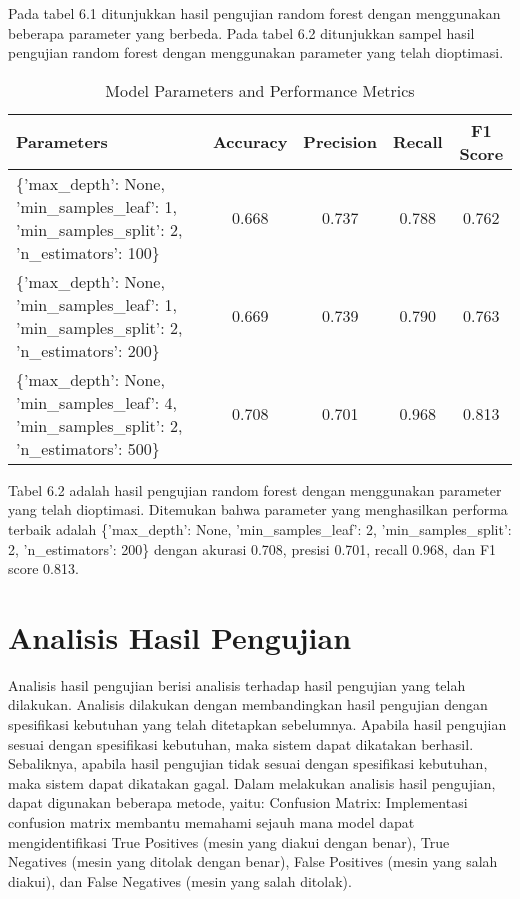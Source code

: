 Pada tabel 6.1 ditunjukkan hasil pengujian random forest dengan menggunakan beberapa parameter yang berbeda. Pada tabel 6.2 ditunjukkan sampel hasil pengujian random forest dengan menggunakan parameter yang telah dioptimasi.


\begin{table}[h]
    \centering
    \begin{tabularx}{\textwidth}{|X|c|c|c|c|}
    \hline
    \textbf{Parameters} & \textbf{Accuracy} & \textbf{Precision} & \textbf{Recall} & \textbf{F1 Score} \\
    \hline
    \{'max\_depth': None, 'min\_samples\_leaf': 1, 'min\_samples\_split': 2, 'n\_estimators': 100\} & 0.668 & 0.737 & 0.788 & 0.762 \\
    \hline
    \{'max\_depth': None, 'min\_samples\_leaf': 1, 'min\_samples\_split': 2, 'n\_estimators': 200\} & 0.669 & 0.739 & 0.790 & 0.763 \\
    \hline
    \{'max\_depth': None, 'min\_samples\_leaf': 4, 'min\_samples\_split': 2, 'n\_estimators': 500\} & 0.708 & 0.701 & 0.968 & 0.813 \\
    \hline
    \end{tabularx}
    \caption{Model Parameters and Performance Metrics}
    \label{table:1}
\end{table}

Tabel 6.2 adalah hasil pengujian random forest dengan menggunakan parameter yang telah dioptimasi. Ditemukan bahwa parameter yang menghasilkan performa terbaik adalah \{'max\_depth': None, 'min\_samples\_leaf': 2, 'min\_samples\_split': 2, 'n\_estimators': 200\} dengan akurasi 0.708, presisi 0.701, recall 0.968, dan F1 score 0.813.

\section{Analisis Hasil Pengujian}
Analisis hasil pengujian berisi analisis terhadap hasil pengujian yang telah dilakukan. Analisis dilakukan dengan membandingkan hasil pengujian dengan spesifikasi kebutuhan yang telah ditetapkan sebelumnya. Apabila hasil pengujian sesuai dengan spesifikasi kebutuhan, maka sistem dapat dikatakan berhasil. Sebaliknya, apabila hasil pengujian tidak sesuai dengan spesifikasi kebutuhan, maka sistem dapat dikatakan gagal.
Dalam melakukan analisis hasil pengujian, dapat digunakan beberapa metode, yaitu:
Confusion Matrix: Implementasi confusion matrix membantu memahami sejauh mana model dapat mengidentifikasi True Positives (mesin yang diakui dengan benar), True Negatives (mesin yang ditolak dengan benar), False Positives (mesin yang salah diakui), dan False Negatives (mesin yang salah ditolak).


